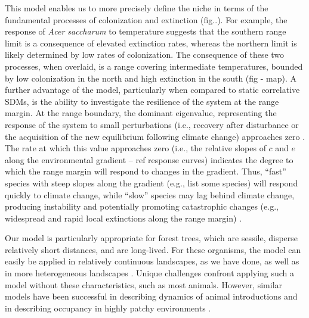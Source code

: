 \documentclass[11pt]{article}
\begin{document}
This model enables us to more precisely define the niche in terms of the fundamental processes of colonization and extinction (fig..). 
For example, the response of \emph{Acer saccharum} to temperature suggests that the southern range limit is a consequence of elevated extinction rates, whereas the northern limit is likely determined by low rates of colonization.
The consequence of these two processes, when overlaid, is a range covering intermediate temperatures, bounded by low colonization in the north and high extinction in the south (fig - map).
A further advantage of the model, particularly when compared to static correlative SDMs, is the ability to investigate the resilience of the system at the range margin.
At the range boundary, the dominant eigenvalue, representing the response of the system to small perturbations (i.e., recovery after disturbance or the acquisition of the new equilibrium following climate change) approaches zero \cite{Scheffer2009}.
The rate at which this value approaches zero (i.e., the relative slopes of $c$ and $e$ along the environmental gradient -- ref response curves) indicates the degree to which the range margin will respond to changes in the gradient.
Thus, “fast” species with steep slopes along the gradient (e.g., list some species) will respond quickly to climate change, while “slow” species may lag behind climate change, producing instability and potentially promoting catastrophic changes (e.g., widespread and rapid local extinctions along the range margin) \cite{Scheffer2009, Scheffer2012}. %

Our model is particularly appropriate for forest trees, which are sessile, disperse relatively short distances, and are long-lived.
For these organisms, the model can easily be applied in relatively continuous landscapes, as we have done, as well as in more heterogeneous landscapes \cite{Garcia2013}.
Unique challenges confront applying such a model without these characteristics, such as most animals.
However, similar models have been successful in describing dynamics of animal introductions \cite{Yackulic2015} and in describing occupancy in highly patchy environments \cite{Ovaskainen2004, Harrison2011}.
\end{document}
